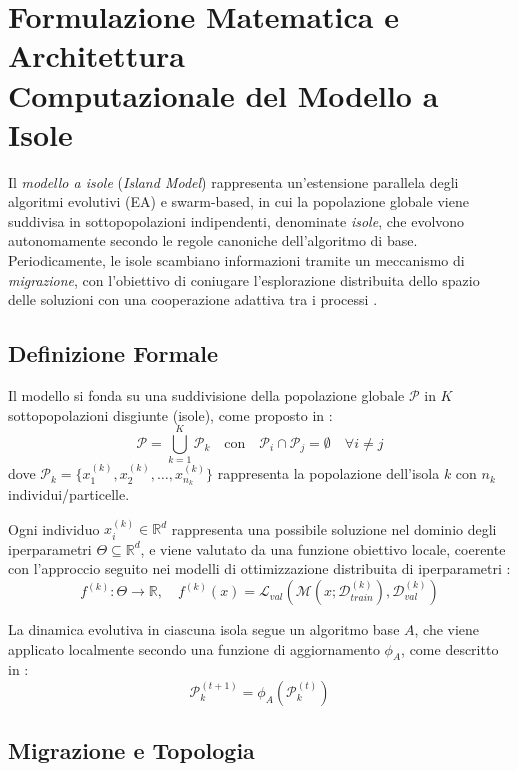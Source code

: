 \documentclass{article}
\begin{document}
\section{Formulazione Matematica e Architettura \\Computazionale del Modello a Isole}

Il \textit{modello a isole} (\textit{Island Model}) rappresenta un'estensione parallela degli algoritmi 
evolutivi (EA) e swarm-based, in cui la popolazione globale viene suddivisa in sottopopolazioni 
indipendenti, denominate \textit{isole}, che evolvono autonomamente secondo le regole canoniche 
dell'algoritmo di base. Periodicamente, le isole scambiano informazioni tramite un meccanismo di 
\textit{migrazione}, con l’obiettivo di coniugare l'esplorazione distribuita dello spazio delle soluzioni 
con una cooperazione adattiva tra i processi \cite{tomassini2005spatially, cantupaz1998survey}.

\subsection{Definizione Formale}

Il modello si fonda su una suddivisione della popolazione globale $\mathcal{P}$ in $K$ sottopopolazioni 
disgiunte (isole), come proposto in \cite{alba2002parallelism, tomassini2005spatially}:
\[
\mathcal{P} = \bigcup_{k=1}^K \mathcal{P}_k \quad \text{con} \quad \mathcal{P}_i \cap \mathcal{P}_j = \emptyset \quad \forall i \neq j
\]
dove $\mathcal{P}_k = \{x_1^{(k)}, x_2^{(k)}, \dots, x_{n_k}^{(k)}\}$ rappresenta la popolazione dell'isola $k$ con $n_k$ individui/particelle.

Ogni individuo $x_i^{(k)} \in \mathbb{R}^d$ rappresenta una possibile soluzione nel dominio degli 
iperparametri $\Theta \subseteq \mathbb{R}^d$, e viene valutato da una funzione obiettivo locale, 
coerente con l'approccio seguito nei modelli di ottimizzazione distribuita di iperparametri \cite{li2019openbox}:
\[
f^{(k)} : \Theta \to \mathbb{R}, \quad f^{(k)}(x) = \mathcal{L}_{val}(\mathcal{M}(x; \mathcal{D}_{train}^{(k)}), \mathcal{D}_{val}^{(k)})
\]

La dinamica evolutiva in ciascuna isola segue un algoritmo base $A$, che viene applicato localmente 
secondo una funzione di aggiornamento $\phi_A$, come descritto in \cite{kennedy1995particle, engelbrecht2007computational}:
\[
\mathcal{P}_k^{(t+1)} = \phi_A(\mathcal{P}_k^{(t)})
\]

\subsection{Migrazione e Topologia}
\end{document}
